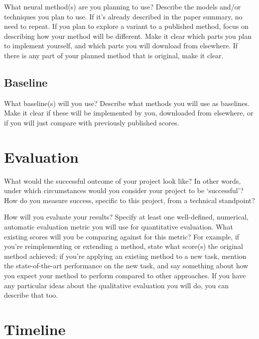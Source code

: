 \documentclass[10pt,twocolumn,letterpaper]{article}
\begin{document}
What neural method(s) are you planning to use? Describe the models and/or techniques you plan to use. If it's already described in the paper summary, no need to repeat. If you plan to explore a variant to a published method, focus on describing how your method will be different. Make it clear which parts you plan to implement yourself, and which parts you will download from elsewhere. If there is any part of your planned method that is original, make it clear.

\subsection{Baseline}

What baseline(s) will you use? Describe what methods you will use as baselines. Make it clear if these will be implemented by you, downloaded from elsewhere, or if you will just compare with previously published scores.

\section{Evaluation}

What would the successful outcome of your project look like? In other words, under which circumstances would you consider your project to be `successful'? How do you measure success, specific to this project, from a technical standpoint?

How will you evaluate your results? Specify at least one well-defined, numerical, automatic evaluation metric you will use for quantitative evaluation. What existing scores will you be comparing against for this metric? For example, if you're reimplementing or extending a method, state what score(s) the original method achieved; if you're applying an existing method to a new task, mention the state-of-the-art performance on the new task, and say something about how you expect your method to perform compared to other approaches. If you have any particular ideas about the qualitative evaluation you will do, you can describe that too.


\section{Timeline}



{\small


}
\end{document}
